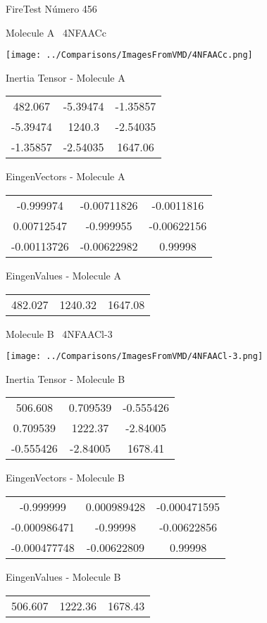 \vtab[-3cm]
\begin{center}
{\large FireTest \tab Número 456}
\end{center}
\begin{multicols}{2}
\begin{center}

Molecule A \
4NFAACc

\texttt{[image: ../Comparisons/ImagesFromVMD/4NFAACc.png]}

Inertia Tensor - Molecule A \\
\begin{tabular}{|c c c|}
482.067	 & 	-5.39474	 & 	-1.35857	 \\
-5.39474	 & 	1240.3	 & 	-2.54035	 \\
-1.35857	 & 	-2.54035	 & 	1647.06
\end{tabular}

\vtab
 EingenVectors - Molecule A     \\
\begin{tabular}{|c c c|}
-0.999974	 & 	-0.00711826	 & 	-0.0011816	 \\
0.00712547	 & 	-0.999955	 & 	-0.00622156	 \\
-0.00113726	 & 	-0.00622982	 & 	0.99998
\end{tabular}

\vtab
 EingenValues - Molecule A     \\
\begin{tabular}{|c c c|}
482.027	 & 	1240.32	 & 	1647.08	 \\
\end{tabular}
\columnbreak

Molecule B \
4NFAACl-3

\texttt{[image: ../Comparisons/ImagesFromVMD/4NFAACl-3.png]}

Inertia Tensor - Molecule B \\
\begin{tabular}{|c c c|}
506.608	 & 	0.709539	 & 	-0.555426	 \\
0.709539	 & 	1222.37	 & 	-2.84005	 \\
-0.555426	 & 	-2.84005	 & 	1678.41
\end{tabular}

\vtab
 EingenVectors - Molecule B     \\
\begin{tabular}{|c c c|}
-0.999999	 & 	0.000989428	 & 	-0.000471595	 \\
-0.000986471	 & 	-0.99998	 & 	-0.00622856	 \\
-0.000477748	 & 	-0.00622809	 & 	0.99998
\end{tabular}

\vtab
 EingenValues - Molecule B     \\
\begin{tabular}{|c c c|}
506.607	 & 	1222.36	 & 	1678.43	 \\
\end{tabular}

\end{center}
\end{multicols}

